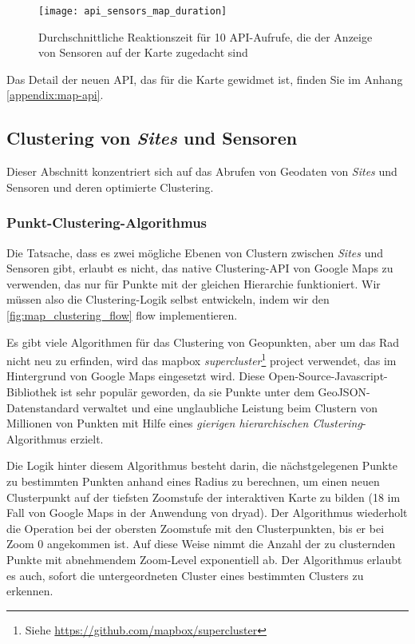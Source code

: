 \begin{figure}[H]
  \centering
  \texttt{[image: api\_sensors\_map\_duration]}
  \caption{Durchschnittliche Reaktionszeit für 10 API-Aufrufe, die der Anzeige von Sensoren auf der Karte zugedacht sind}
  \label{fig:api_sensors_map_duration}
\end{figure}

Das Detail der neuen API, das für die Karte gewidmet ist, finden Sie im Anhang \ref{appendix:map-api}.

\subsection{Clustering von \textit{Sites} und Sensoren}

Dieser Abschnitt konzentriert sich auf das Abrufen von Geodaten von \textit{Sites} und Sensoren und deren optimierte Clustering.

\subsubsection{Punkt-Clustering-Algorithmus}

Die Tatsache, dass es zwei mögliche Ebenen von Clustern zwischen \textit{Sites} und Sensoren gibt, erlaubt es nicht, das native Clustering-API von Google Maps zu verwenden, das nur für Punkte mit der gleichen Hierarchie funktioniert.
Wir müssen also die Clustering-Logik selbst entwickeln, indem wir den \ref{fig:map_clustering_flow} flow implementieren.

Es gibt viele Algorithmen für das Clustering von Geopunkten, aber um das Rad nicht neu zu erfinden, wird das mapbox \textit{supercluster}\footnote{Siehe \href{https://github.com/mapbox/supercluster}{https://github.com/mapbox/supercluster}} project verwendet, das im Hintergrund von Google Maps eingesetzt wird.
Diese Open-Source-Javascript-Bibliothek ist sehr populär geworden, da sie Punkte unter dem GeoJSON-Datenstandard\cite{rfc7946} verwaltet und eine unglaubliche Leistung beim Clustern von Millionen von Punkten mit Hilfe eines \textit{gierigen hierarchischen Clustering}-Algorithmus\cite{supercluster} erzielt.

Die Logik hinter diesem Algorithmus besteht darin, die nächstgelegenen Punkte zu bestimmten Punkten anhand eines Radius zu berechnen, um einen neuen Clusterpunkt auf der tiefsten Zoomstufe der interaktiven Karte zu bilden (18 im Fall von Google Maps in der Anwendung von dryad).
Der Algorithmus wiederholt die Operation bei der obersten Zoomstufe mit den Clusterpunkten, bis er bei Zoom 0 angekommen ist.
Auf diese Weise nimmt die Anzahl der zu clusternden Punkte mit abnehmendem Zoom-Level exponentiell ab.
Der Algorithmus erlaubt es auch, sofort die untergeordneten Cluster eines bestimmten Clusters zu erkennen.

